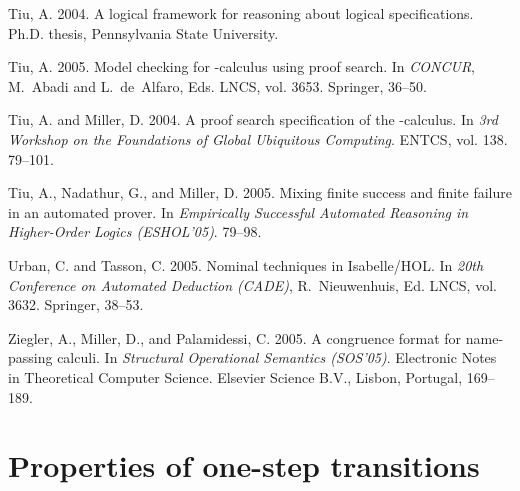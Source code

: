 \documentclass{acmtrans2m}
\begin{document}
\begin{thebibliography}{}
{\sc Tiu, A.} 2004.
\newblock A logical framework for reasoning about logical specifications.
\newblock Ph.D. thesis, Pennsylvania State University.

{\sc Tiu, A.} 2005.
\newblock Model checking for -calculus using proof search.
\newblock In {\em CONCUR}, {M.~Abadi} {and} {L.~de~Alfaro}, Eds. LNCS, vol.
  3653. Springer, 36--50.

{\sc Tiu, A.} {\sc and} {\sc Miller, D.} 2004.
\newblock A proof search specification of the -calculus.
\newblock In {\em 3rd Workshop on the Foundations of Global Ubiquitous
  Computing}. ENTCS, vol. 138. 79--101.

{\sc Tiu, A.}, {\sc Nadathur, G.}, {\sc and} {\sc Miller, D.} 2005.
\newblock Mixing finite success and finite failure in an automated prover.
\newblock In {\em Empirically Successful Automated Reasoning in Higher-Order
  Logics (ESHOL'05)}. 79--98.

{\sc Urban, C.} {\sc and} {\sc Tasson, C.} 2005.
\newblock Nominal techniques in {I}sabelle/{HOL}.
\newblock In {\em 20th Conference on Automated Deduction (CADE)},
  {R.~Nieuwenhuis}, Ed. LNCS, vol. 3632. Springer, 38--53.

{\sc Ziegler, A.}, {\sc Miller, D.}, {\sc and} {\sc Palamidessi, C.} 2005.
\newblock A congruence format for name-passing calculi.
\newblock In {\em Structural Operational Semantics (SOS'05)}. Electronic Notes
  in Theoretical Computer Science. Elsevier Science B.V., Lisbon, Portugal,
  169--189.

\end{thebibliography}

\newpage
\appendix
 
\def\onef{\hbox{\sl one}_f}
\def\oneb{\hbox{\sl one}_b}
\def\pidef{{\bf D}_\pi}
\def\defrule{\mbox{\it def}}


\section{Properties of one-step transitions}
\end{document}
